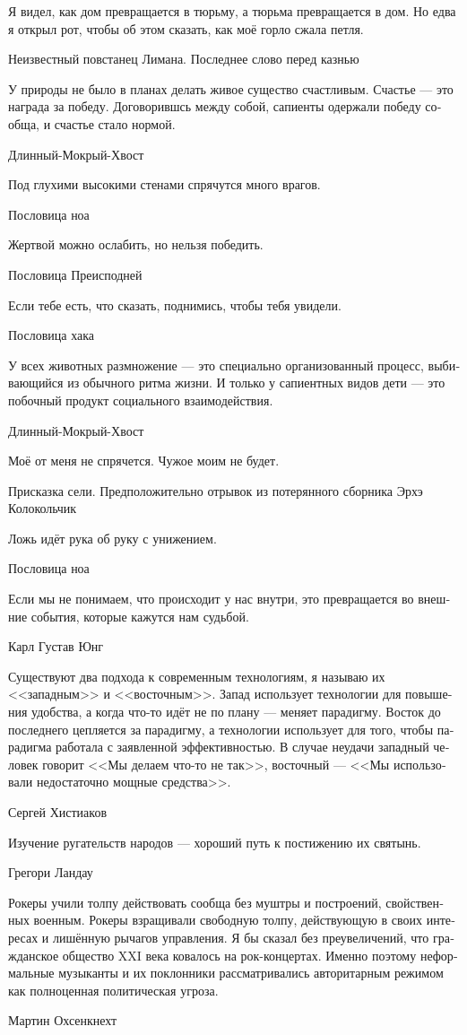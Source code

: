 \documentclass[a4paper,12pt,fleqn]{book}\usepackage{polyglossia}\setdefaultlanguage[babelshorthands=true]{russian}\setotherlanguage{english}\defaultfontfeatures{Ligatures=TeX,Mapping=tex-text}\usepackage{xcolor}\newcommand{\ml}[3]{#2}
\begin{document}
{\epigraph
{Я видел, как дом превращается в тюрьму, а тюрьма превращается в дом.
Но едва я открыл рот, чтобы об этом сказать, как моё горло сжала петля.}
{Неизвестный повстанец Лимана.
Последнее слово перед казнью}

\epigraph{У природы не было в планах делать живое существо счастливым.
Счастье --- это награда за победу.
Договорившсь между собой, сапиенты одержали победу сообща, и счастье стало нормой.}
{Длинный-Мокрый-Хвост}

\epigraph{Под глухими высокими стенами спрячутся много врагов.}
{Пословица ноа}

\epigraph
{Жертвой можно ослабить, но нельзя победить.}
{Пословица Преисподней}

\epigraph
{Если тебе есть, что сказать, поднимись, чтобы тебя увидели.}
{Пословица хака}

\epigraph
{У всех животных размножение --- это специально организованный процесс, выбивающийся из обычного ритма жизни.
И только у сапиентных видов дети --- это побочный продукт социального взаимодействия.}
{Длинный-Мокрый-Хвост}

\epigraph
{Моё от меня не спрячется.
Чужое моим не будет.}
{Присказка сели.
Предположительно отрывок из потерянного сборника Эрхэ Колокольчик}

\epigraph
{Ложь идёт рука об руку с унижением.}
{Пословица ноа}

\epigraph
{Если мы не понимаем, что происходит у нас внутри, это превращается во внешние события, которые кажутся нам судьбой.}
{Карл Густав Юнг}

\epigraph
{Существуют два подхода к современным технологиям, я называю их <<западным>> и <<восточным>>.
Запад использует технологии для повышения удобства, а когда что-то идёт не по плану --- меняет парадигму.
Восток до последнего цепляется за парадигму, а технологии использует для того, чтобы парадигма работала с заявленной эффективностью.
В случае неудачи западный человек говорит <<Мы делаем что-то не так>>, восточный --- <<Мы использовали недостаточно мощные средства>>.}
{Сергей Хистиаков}

\epigraph{Изучение ругательств народов --- хороший путь к постижению их святынь.}
{Грегори Ландау}

\epigraph
{Рокеры учили толпу действовать сообща без муштры и построений, свойственных военным.
Рокеры взращивали свободную толпу, действующую в своих интересах и лишённую рычагов управления.
Я бы сказал без преувеличений, что гражданское общество XXI века ковалось на рок-концертах.
Именно поэтому неформальные музыканты и их поклонники рассматривались авторитарным режимом как полноценная политическая угроза.}
{Мартин Охсенкнехт}

}
\end{document}
